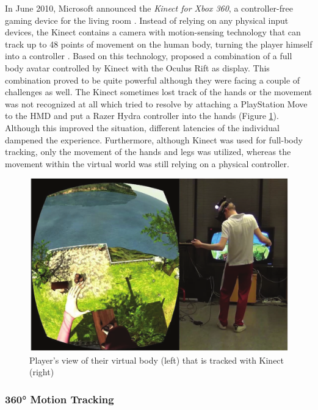 In June 2010, Microsoft announced the \textit{Kinect for Xbox 360}, a controller-free gaming device for the living room \citep{Microsoft2010}. Instead of relying on any physical input devices, the Kinect contains a camera with motion-sensing technology that can track up to 48 points of movement on the human body, turning the player himself into a controller \citep{Microsoft2010}. \newline
Based on this technology, \cite{Takala2014} proposed a combination of a full body avatar controlled by Kinect with the Oculus Rift as display. This combination proved to be quite powerful although they were facing a couple of challenges as well. The Kinect sometimes lost track of the hands or the movement was not recognized at all which \cite{Takala2014} tried to resolve by attaching a PlayStation Move to the HMD and put a Razer Hydra controller into the hands (Figure \ref{fig:kinectbody}). Although this improved the situation, different latencies of the individual dampened the experience. Furthermore, although Kinect was used for full-body tracking, only the movement of the hands and legs was utilized, whereas the movement within the virtual world was still relying on a physical controller.
\begin{figure}[h]
	\begin{center}
		\includegraphics[width=12cm]{03_Figures/05_LitReview/Takala2014_KinectBody.png}
		\caption[Player's view of their virtual body that is tracked with Kinect]{Player's view of their virtual body (left) that is tracked with Kinect (right) \citep{Takala2014}}
		\label{fig:kinectbody}
	\end{center}
\end{figure}


\subsubsection{360° Motion Tracking}
\label{360MotionTracking}

